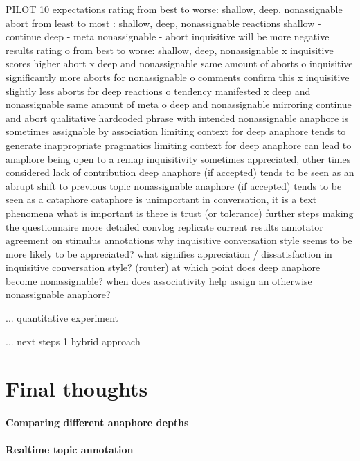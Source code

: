 \documentclass[12pt]{report}
\begin{document}
{PILOT 10
    expectations
		rating
			from best to worse: shallow, deep, nonassignable
		abort
			from least to most : shallow, deep, nonassignable
		reactions
			shallow 	- continue
			deep		- meta
			nonassignable 	- abort
		inquisitive will be more negative
	results
		rating
			o from best to worse: shallow, deep, nonassignable
			x inquisitive scores higher
		abort
			x deep and nonassignable same amount of aborts
			o inquisitive significantly more aborts for nonassignable
			o comments confirm this
			x inquisitive slightly less aborts for deep
		reactions
			o tendency manifested
			x deep and nonassignable same amount of meta
			o deep and nonassignable mirroring continue and abort
	qualitative
		hardcoded phrase with intended nonassignable anaphore is sometimes assignable by association
		limiting context for deep anaphore tends to generate inappropriate pragmatics
		limiting context for deep anaphore can lead to anaphore being open to a remap
		inquisitivity sometimes appreciated, other times considered lack of contribution
		deep anaphore (if accepted) tends to be seen as an abrupt shift to previous topic
		nonassignable anaphore (if accepted) tends to be seen as a cataphore
		        cataphore is unimportant in conversation, it is a text phenomena
			    what is important is there is trust (or tolerance)
	further steps
		making the questionnaire more detailed
			convlog
		replicate current results
		annotator agreement on stimulus annotations
		why inquisitive conversation style seems to be more likely to be appreciated?
		what signifies appreciation / dissatisfaction in inquisitive conversation style? (router)
		at which point does deep anaphore become nonassignable?
		when does associativity help assign an otherwise nonassignable anaphore?


        ... quantitative experiment

        ... next steps
        1 hybrid approach
\fi

\chapter*{Final thoughts}

\subsubsection{Comparing different anaphore depths}
\subsubsection{Realtime topic annotation}
}
\end{document}
